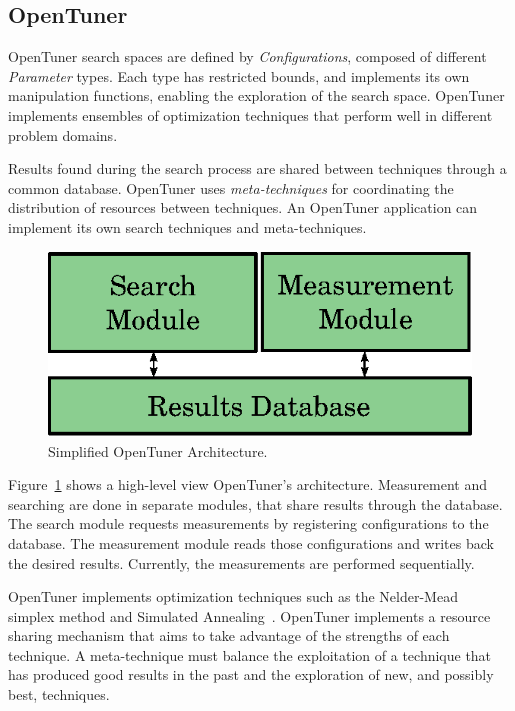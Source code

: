 \documentclass[a4paper, 12pt]{article}
\begin{document}
\subsection{OpenTuner} \label{sec:opt}

OpenTuner search spaces are defined by \emph{Configurations}, composed of
different \emph{Parameter} types. Each type has restricted bounds, and
implements its own manipulation functions, enabling the exploration of the
search space.  OpenTuner implements ensembles of optimization
techniques that perform well in different problem domains.

Results found during the search process are shared between techniques through a
common database. OpenTuner uses \emph{meta-techniques} for coordinating
the distribution of resources between techniques. An OpenTuner
application can implement its own search techniques and meta-techniques.

\begin{figure}[htpb]
    \centering
    \includegraphics[scale=.75]{opentuner-implementation}
    \caption{Simplified OpenTuner Architecture.}
    \label{fig:ot-imp}
\end{figure}

Figure~\ref{fig:ot-imp} shows a high-level view OpenTuner's architecture.
Measurement and searching are done in separate modules, that share results
through the database. The search module requests measurements by registering
configurations to the database. The measurement module reads those
configurations and writes back the desired results. Currently, the
measurements are performed sequentially.

OpenTuner implements optimization techniques such as the
Nelder-Mead~\cite{nelder1965simplex} simplex
method and Simulated Annealing~\cite{kirkpatrick1983optimization}.
OpenTuner implements a resource sharing mechanism that aims to take
advantage of the strengths of each technique. A meta-technique
must balance the exploitation of a technique that has produced
good results in the past and the exploration of new, and possibly
best, techniques.
\end{document}
